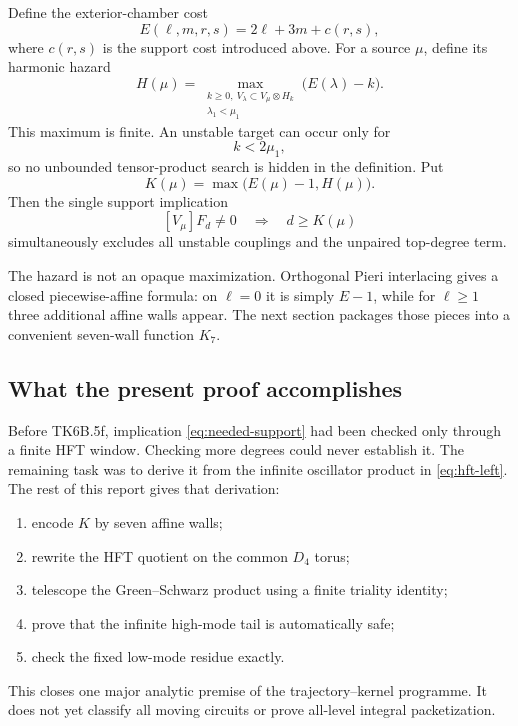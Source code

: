 \documentclass[11pt,a4paper]{article}
\theoremstyle{definition}
\begin{document}
Define the exterior-chamber cost
\[
   E(\ell,m,r,s)=2\ell+3m+c(r,s),
\]
where $c(r,s)$ is the support cost introduced above.  For a source $\mu$,
define its harmonic hazard
\[
 H(\mu)=
 \max_{\substack{k\geq0,\ V_\lambda\subset V_\mu\otimes H_k\\
                  \lambda_1<\mu_1}}
 \bigl(E(\lambda)-k\bigr).
\]
This maximum is finite.  An unstable target can occur only for
\[
   k<2\mu_1,
\]
so no unbounded tensor-product search is hidden in the definition.  Put
\begin{equation}
\label{eq:pieri-threshold}
   K(\mu)=\max\bigl(E(\mu)-1,H(\mu)\bigr).
\end{equation}
Then the single support implication
\begin{equation}
\label{eq:needed-support}
   [V_\mu]F_d\neq0
   \quad\Longrightarrow\quad
   d\geq K(\mu)
\end{equation}
simultaneously excludes all unstable couplings and the unpaired top-degree
term.

The hazard is not an opaque maximization.  Orthogonal Pieri interlacing
\cite{Okada} gives a closed piecewise-affine formula: on $\ell=0$ it is
simply $E-1$, while for $\ell\geq1$ three additional affine walls appear.
The next section packages those pieces into a convenient seven-wall function
$K_7$.

\subsection{What the present proof accomplishes}

Before TK6B.5f, implication \eqref{eq:needed-support} had been checked only
through a finite HFT window.  Checking more degrees could never establish it.
The remaining task was to derive it from the infinite oscillator product in
\eqref{eq:hft-left}.  The rest of this report gives that derivation:
\begin{enumerate}
  \item encode $K$ by seven affine walls;
  \item rewrite the HFT quotient on the common $D_4$ torus;
  \item telescope the Green--Schwarz product using a finite triality identity;
  \item prove that the infinite high-mode tail is automatically safe;
  \item check the fixed low-mode residue exactly.
\end{enumerate}
This closes one major analytic premise of the trajectory--kernel programme.
It does not yet classify all moving circuits or prove all-level integral
packetization.
\end{document}
